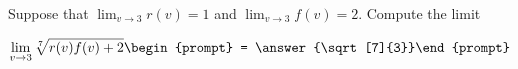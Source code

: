 \documentclass{ximera}
\author{Matthew Carr}
\begin{document}
\begin{exercise}
Suppose that $\lim_{v\to3}r(v)=1$ and $\lim_{v\to3}f(v)=2$. Compute the limit

\[
\lim_{v\to 3 } \sqrt[7]{r(v)f(v)+2}\begin{prompt} = \answer{\sqrt[7]{3}}\end{prompt}
\]
\end{exercise}
\end{document}
